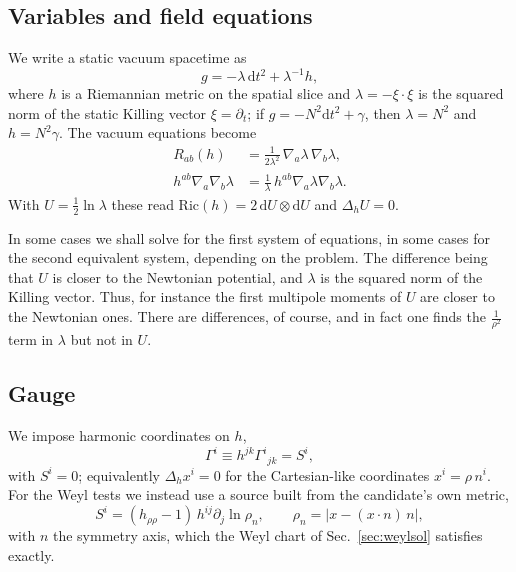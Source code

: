 \documentclass[aps,prd,twocolumn,superscriptaddress, nofootinbib,floatfix]{revtex4-2}
\newcommand{\dd}{\mathrm{d}}
\newcommand{\Ric}{\mathrm{Ric}}
\begin{document}
\subsection{Variables and field equations}

We write a static vacuum spacetime as
\begin{equation}
  g = -\lambda\,\dd t^2 + \lambda^{-1} h ,
  \label{eq:lineelement}
\end{equation}
where $h$ is a Riemannian metric on the spatial slice and $\lambda = -\xi\cdot\xi$ is the squared norm of the static Killing vector $\xi = \partial_t$; if $g = -N^2\dd t^2+\gamma$, then $\lambda = N^2$ and $h = N^2\gamma$.
The vacuum equations become
\begin{align}
  R_{ab}(h) &= \frac{1}{2\lambda^{2}}\,\nabla_a\lambda\,\nabla_b\lambda, \label{eq:ricci}\\
  h^{ab}\nabla_a\nabla_b\lambda &= \frac{1}{\lambda}\,h^{ab}\nabla_a\lambda\nabla_b\lambda . \label{eq:lam}
\end{align}
With $U = \tfrac12\ln\lambda$ these read $\Ric(h) = 2\,\dd U\otimes\dd U$ and $\Delta_h U = 0$.

In some cases we shall solve for the first system of equations, in some cases for the second equivalent system, depending on the problem.
The difference being that $U$ is closer to the Newtonian potential, and $\lambda$ is the squared norm of the Killing vector.
Thus, for instance the first multipole moments of $U$ are closer to the Newtonian ones.
There are differences, of course, and in fact one finds the $\frac{1}{\rho^2}$ term in $\lambda$ but not in $U$.


\subsection{Gauge}

We impose harmonic coordinates on $h$,
\begin{equation}
  \Gamma^i \equiv h^{jk}\Gamma^i{}_{jk} = S^i ,
  \label{eq:gauge}
\end{equation}
with $S^i = 0$; equivalently $\Delta_h x^i = 0$ for the Cartesian-like coordinates $x^i = \rho\, n^i$.
For the Weyl tests we instead use a source built from the candidate's own metric,
\begin{equation}
  S^i = (h_{\rho\rho} - 1)\, h^{ij}\partial_j \ln \rho_n , \qquad
  \rho_n = \bigl|x - (x\cdot n)\,n\bigr| ,
  \label{eq:cylsource}
\end{equation}
with $n$ the symmetry axis, which the Weyl chart of Sec.~\ref{sec:weylsol} satisfies exactly.
\end{document}

